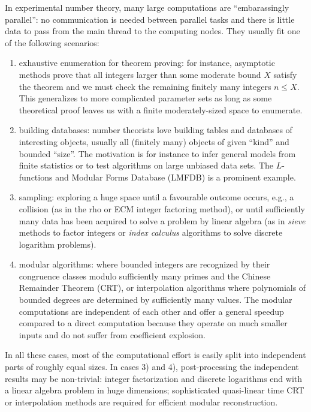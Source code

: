 \documentclass{deliverablereport}
\begin{document}
In experimental number theory, many large computations are ``embarassingly
parallel'': no communication is needed between parallel tasks and there is
little data to pass from the main thread to the computing nodes. They usually
fit one of the following scenarios:
\begin{enumerate}
  \item exhaustive enumeration for theorem proving: for instance, asymptotic
    methods prove that all integers larger than some moderate bound $X$
    satisfy the theorem and we must check the remaining finitely many
    integers $n \leq X$. This generalizes to more complicated parameter sets
    as long as some theoretical proof leaves us with a finite
    moderately-sized space to enumerate.

  \item building databases: number theorists love building tables and
    databases of interesting objects, usually all (finitely many) objects
    of given ``kind'' and bounded ``size''. The motivation is for instance
    to infer general models from finite statistics or to test algorithms on
    large unbiased data sets. The $L$-functions and Modular Forms Database
    (LMFDB) is a prominent example.

  \item sampling: exploring a huge space until a favourable outcome occurs,
    e.g., a collision (as in the rho or ECM integer factoring method), or
    until sufficiently many data has been acquired to solve a problem by
    linear algebra (as in \emph{sieve} methods to factor integers or
    \emph{index calculus} algorithms to solve discrete logarithm problems).

  \item modular algorithms: where bounded integers are recognized by their
    congruence classes modulo sufficiently many primes and the Chinese
    Remainder Theorem (CRT), or interpolation algorithms where polynomials of
    bounded degrees are determined by sufficiently many values. The modular
    computations are independent of each other and offer a general speedup
    compared to a direct computation because they operate on much smaller
    inputs and do not suffer from coefficient explosion.
\end{enumerate}

In all these cases, most of the computational effort is easily split into
independent parts of roughly equal sizes. In cases 3) and 4),
post-processing the independent results may be non-trivial: integer
factorization and discrete logarithms end with a linear algebra problem in
huge dimensions; sophisticated quasi-linear time CRT or interpolation methods
are required for efficient modular reconstruction.
\end{document}
